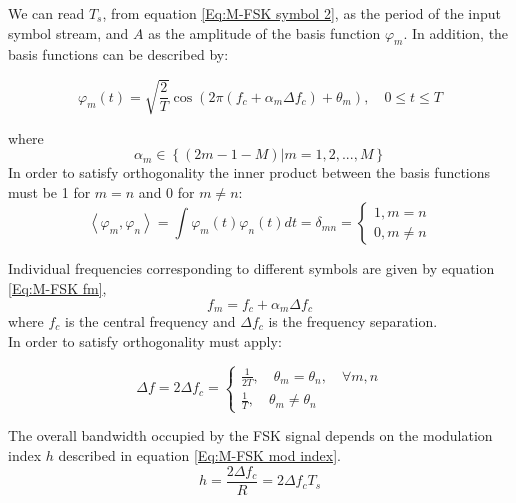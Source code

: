 \documentclass[12pt,a4paper,openright]{report}
\begin{document}
We can read $T_s$, from equation \ref{Eq:M-FSK symbol 2}, as the period of the input symbol stream, and $A$ as the amplitude of the basis function $\varphi_m$. In addition, the basis functions can be described by:

\begin{equation}\label{Eq:M-FSK basis}
{\varphi _m}(t) = \sqrt {\frac{2}{T}} \cos \left( {2\pi ({f_c} + {\alpha _m}\Delta {f_c}) + {\theta _m}} \right), \quad 0 \le t \le T
\end{equation}

where \[
{\alpha _m} \in \left\{ {(2m - 1 - M) | m = 1,2,...,M} \right\}
\] 
In order to satisfy orthogonality the inner product between the basis functions must be 1 for $m=n$ and 0 for $m\neq n$:
\begin{equation}\label{Eq:M-FSK inner product}
\left\langle {\left. {{\varphi _m},{\varphi _n}} \right\rangle } \right. = \int {{\varphi _m}(t){\varphi _n}(t)dt = {\delta _{mn}} = \left\{ \begin{array}{l}
1,m = n\\
0,m \ne n
\end{array} \right.}
\end{equation} 


Individual frequencies corresponding to different symbols are given by equation \ref{Eq:M-FSK fm},
\begin{equation}\label{Eq:M-FSK fm}
{f_m} = {f_c} + {\alpha _m}\Delta {f_c}
\end{equation}
where $f_c$ is the central frequency and $\Delta f_c$ is the frequency separation.\\

In order to satisfy orthogonality \cite{gold} must apply:

\begin{equation}\label{Eq:M-FSK deltaF}
\Delta {f}= 2\Delta {f_c} = \left\{ \begin{array}{l}
\frac{1}{{2T}}, \quad {\theta _m} = {\theta _n}, \quad \forall m,n\\
\frac{1}{T}, \quad {\theta _m} \ne {\theta _n}
\end{array} \right.
\end{equation}

The overall bandwidth occupied by the FSK signal depends on the modulation index $h$ described in equation \ref{Eq:M-FSK mod index}.
\begin{equation}\label{Eq:M-FSK mod index}
h=\frac{2\Delta {f_c}}{R}=2\Delta {f_c}T_s 
\end{equation}
\end{document}
